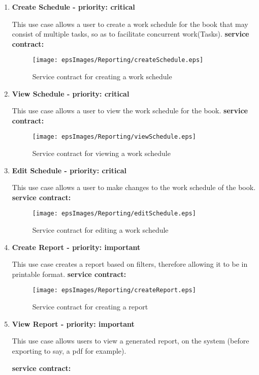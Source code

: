 \begin{enumerate}
\item \textbf{Create Schedule - priority: critical}
\par{This use case allows a user to create a work schedule for the book that may consist of multiple tasks, so as to facilitate concurrent work(Tasks).}
\textbf{service contract:} 
\begin{figure}[h]
\texttt{[image: epsImages/Reporting/createSchedule.eps]}
\caption{Service contract for creating a work schedule}
\end{figure}

\item \textbf{View Schedule - priority: critical}
\par{This use case allows a user to view the work schedule for the book.}
\textbf{service contract:}
\begin{figure}[h]
\texttt{[image: epsImages/Reporting/viewSchedule.eps]}
\caption{Service contract for viewing a work schedule}
\end{figure}

\item \textbf{Edit Schedule - priority: critical}
\par{This use case allows a user to make changes to the work schedule of the book.}
\textbf{service contract:}

\begin{figure}[h]
\texttt{[image: epsImages/Reporting/editSchedule.eps]}
\caption{Service contract for editing a work schedule}
\end{figure}

\item \textbf{Create Report - priority: important}
\par{This use case creates  a report based on filters, therefore allowing it to be in printable format.}
\textbf{service contract:}

\begin{figure}[h]
\texttt{[image: epsImages/Reporting/createReport.eps]}
\caption{Service contract for creating a report}
\end{figure}
\newpage
\item \textbf{View Report - priority: important}
\par{This use case allows users to view a generated report, on the system (before exporting to say, a pdf for example).}
{\textbf{service contract:}

}
\end{enumerate}
